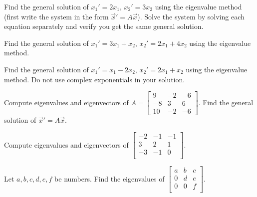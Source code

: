 \begin{exercise}
\leavevmode
\begin{tasks}
\task
Find the general solution of $x_1' = 2 x_1$, $x_2' = 3 x_2$ using the
eigenvalue method (first write the system in the form
${\vec{x}}' = A \vec{x}$).
\task
Solve the system by solving each equation
separately and verify you get the same general solution.
\end{tasks}
\end{exercise}

\begin{exercise}
Find the general solution of $x_1' = 3 x_1 + x_2$,
$x_2' = 2 x_1 + 4 x_2$ using the eigenvalue method.
\end{exercise}

\begin{exercise}
Find the general solution of $x_1' = x_1 -2 x_2$,
$x_2' = 2 x_1 + x_2$ using the eigenvalue method.
Do not use complex exponentials in your solution.
\end{exercise}

\begin{exercise}
\leavevmode
\begin{tasks}
\task
Compute eigenvalues and eigenvectors of
$A = \left[ \begin{smallmatrix}
9 & -2 & -6 \\
-8 & 3 & 6 \\
10 & -2 & -6
\end{smallmatrix} \right]$.
\task
Find the general solution of ${\vec{x}}' = A \vec{x}$.
\end{tasks}
\end{exercise}

\begin{exercise}
Compute eigenvalues and eigenvectors of
$\left[ \begin{smallmatrix}
-2 & -1 & -1 \\
3 & 2 & 1 \\
-3 & -1 & 0 \\
\end{smallmatrix} \right]$.
\end{exercise}

\begin{exercise}
Let $a,b,c,d,e,f$ be numbers.  Find the eigenvalues of
$\left[ \begin{smallmatrix}
a & b & c \\
0 & d & e \\
0 & 0 & f \\
\end{smallmatrix} \right]$.
\end{exercise}

